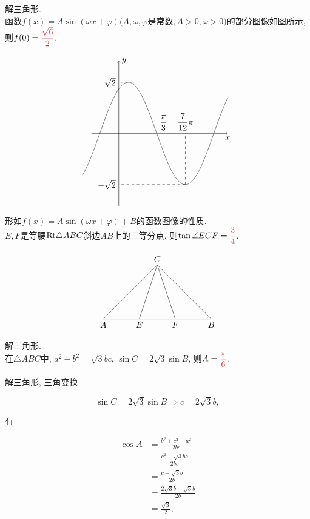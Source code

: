\documentclass[8pt]{article}
\begin{document}
		解三角形.
		~\\

		函数$f(x)=A\sin(\omega x+\varphi) (A, \omega, \varphi$是常数$, A>0, \omega > 0)$的部分图像如图所示, 则$f(0)=\ansmath{\dfrac{\sqrt{6}}{2}}$.

		$$
			\begin{tikzpicture}[scale = 1.5, baseline = 0]
				\draw[black, ->] (-0.75, 0)--(3, 0) node[below] {$x$} node at ({pi/3}, 0)[anchor = south west] {$\dfrac{\pi}{3}$};
				\draw[black, ->] (0, -2)--(0, 2) node[right] {$y$};
				\draw[black, domain = -1 : 3, samples = 2000] plot(\x, {sqrt(2) * sin(deg(2 * \x + pi / 3))});
				\draw[black, dashed] ({1 / 12 * pi}, {sqrt(2)})--(0, {sqrt(2)}) node[left] {$\sqrt{2}$};
				\draw[black, dashed] ({7 / 12 * pi}, {-sqrt(2)})--(0, {-sqrt(2)}) node[left] {$-\sqrt{2}$};
				\draw[black, dashed] ({7 / 12 * pi}, {-sqrt(2)})--({7 / 12 * pi}, {0}) node[above] {$\dfrac{7}{12}\pi$};
			\end{tikzpicture}
		$$
		
		形如$f(x)=A\sin(\omega x+\varphi)+B$的函数图像的性质.
		~\\
		
		$E, F$是等腰$\mathrm{Rt} \triangle ABC$斜边$AB$上的三等分点, 则$\tan \angle ECF=\ansmath{\dfrac{3}{4}}$.

		$$
			\begin{tikzpicture}[scale = 1.5, baseline = 0]
				\draw[black] (0, 0)--(3, 0)--(1.5, 1.5)--(0, 0) node at (0, 0) [anchor = north] {$A$} node at (3, 0) [anchor = north] {$B$} node at (1.5, 1.5) [anchor = south] {$C$};
				\draw[black] (1, 0)--(1.5, 1.5)--(2, 0) node at (1, 0) [anchor = north] {$E$} node at (2, 0) [anchor = north] {$F$};
			\end{tikzpicture}
		$$
		
		解三角形.
		~\\

		在$\triangle ABC$中, $a^2 - b^2 = \sqrt{3} bc$, $\sin C = 2\sqrt{3} \sin B$, 则$A=\ansmath{\dfrac{\pi}{6}}$.
		
		解三角形, 三角变换.

		$$\sin C = 2\sqrt{3} \sin B \Rightarrow c=2\sqrt{3} b,$$

		有

		\begin{align*}
			\cos A &= \frac{b^2 + c^2 - a^2}{2bc}\\
			       &= \frac{c^2 - \sqrt{3} bc}{2bc}\\
			       &= \frac{c - \sqrt{3}b}{2b}\\
			       &= \frac{2\sqrt{3}b - \sqrt{3}b}{2b}\\
			       &= \frac{\sqrt{3}}{2},
		\end{align*}
\end{document}
